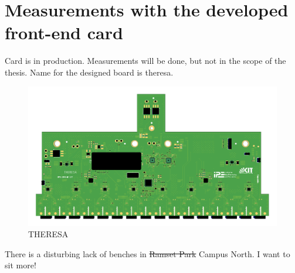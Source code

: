 \section{Measurements with the developed front-end card}
Card is in production. Measurements will be done, but not in the scope of the thesis.
Name for the designed board is \gls{theresa}.
\begin{figure}[H]
	\centering
	\includegraphics[width = \textwidth]{chap/06-conclusion/img/board}
	\caption{THERESA}
	\label{fig:board}
\end{figure}



There is a disturbing lack of benches in \sout{Ramset Park} Campus North. I want to sit more!
